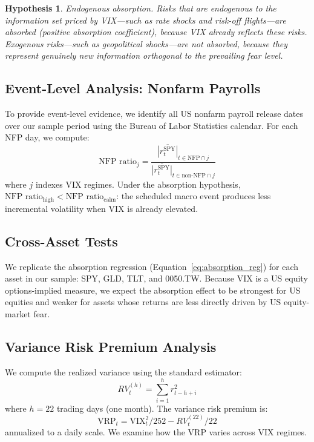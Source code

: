 \documentclass[12pt,a4paper]{article}
\newtheorem{hypothesis}{Hypothesis}
\begin{document}
\begin{hypothesis}
\textit{Endogenous absorption.} Risks that are endogenous to the information set priced by VIX---such as rate shocks and risk-off flights---are absorbed (positive absorption coefficient), because VIX already reflects these risks. Exogenous risks---such as geopolitical shocks---are not absorbed, because they represent genuinely new information orthogonal to the prevailing fear level.
\label{hyp:endo_exo}
\end{hypothesis}

\subsection{Event-Level Analysis: Nonfarm Payrolls}

To provide event-level evidence, we identify all US nonfarm payroll release dates over our sample period using the Bureau of Labor Statistics calendar. For each NFP day, we compute:
\begin{equation}
\text{NFP ratio}_j = \frac{\overline{|r_t^{\text{SPY}}|}_{t \in \text{NFP} \cap j}}{\overline{|r_t^{\text{SPY}}|}_{t \in \text{non-NFP} \cap j}}
\label{eq:nfp_ratio}
\end{equation}
where $j$ indexes VIX regimes. Under the absorption hypothesis, $\text{NFP ratio}_{\text{high}} < \text{NFP ratio}_{\text{calm}}$: the scheduled macro event produces less incremental volatility when VIX is already elevated.

\subsection{Cross-Asset Tests}

We replicate the absorption regression (Equation~\ref{eq:absorption_reg}) for each asset in our sample: SPY, GLD, TLT, and 0050.TW. Because VIX is a US equity options-implied measure, we expect the absorption effect to be strongest for US equities and weaker for assets whose returns are less directly driven by US equity-market fear.

\subsection{Variance Risk Premium Analysis}

We compute the realized variance using the standard estimator:
\begin{equation}
RV_t^{(h)} = \sum_{i=1}^{h} r_{t-h+i}^2
\label{eq:rv}
\end{equation}
where $h = 22$ trading days (one month). The variance risk premium is:
\begin{equation}
\text{VRP}_t = \text{VIX}_t^2 / 252 - RV_t^{(22)} / 22
\label{eq:vrp}
\end{equation}
annualized to a daily scale. We examine how the VRP varies across VIX regimes.
\end{document}
